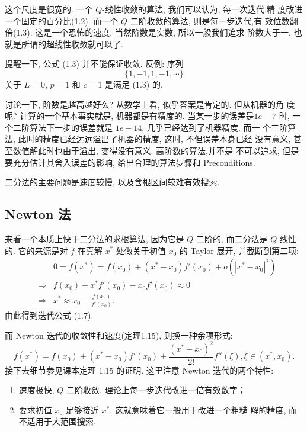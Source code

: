 \documentclass[a4paper]{ctexart}
\newcommand{\remark}[1]
{\noindent {\bf Remark {#1}}}
\begin{document}
这个尺度是很宽的. 一个 $Q$-线性收敛的算法, 我们可以认为, 每一次迭代,精
度改进一个固定的百分比(1.2). 而一个 $Q$-二阶收敛的算法, 则是每一步迭代,有
效位数翻倍(1.3). 这是一个恐怖的速度. 当然阶数是实数, 所以一般我们追求
阶数大于一, 也就是所谓的超线性收敛就可以了.

\remark{1.13} 提醒一下, 公式 (1.3) 并不能保证收敛. 反例: 序列
$$
\{1, -1, 1, -1, \cdots \}
$$
关于 $L = 0$, $p = 1$ 和 $c = 1$ 是满足 (1.3) 的.

讨论一下, 阶数是越高越好么? 从数学上看, 似乎答案是肯定的. 但从机器的角
度呢? 计算的一个基本事实就是, 机器都是有精度的. 当某一步的误差是$1e-7$
时, 一个二阶算法下一步的误差就是 $1e-14$, 几乎已经达到了机器精度. 而一
个三阶算法, 此时的精度已经远远溢出了机器的精度, 这时, 不但误差本身已经
没有意义, 甚至数值解此时也由于溢出, 变得没有意义. 高阶数的算法,并不是
不可以追求, 但是要充分估计其舍入误差的影响, 给出合理的算法步骤和
Preconditions.

\remark{1.15} 二分法的主要问题是速度较慢, 以及含根区间较难有效搜索. 


\subsection{Newton 法}

来看一个本质上快于二分法的求根算法, 因为它是 $Q$-二阶的, 而二分法是
$Q$-线性的. 它的来源是对 $f$ 在真解 $x^*$ 处做关于初值 $x_0$ 的 Taylor
展开, 并截断到第二项:
\begin{eqnarray*}
  &&0 = f(x^*)=f(x_0)+(x^* - x_0)f'(x_0) + o(|x^* - x_0|^2) \\
  &\Rightarrow&f(x_0) + x^*f'(x_0) - x_0f'(x_0) \approx 0 \\
  &\Rightarrow&x^* \approx x_0 - \frac{f(x_0)}{f'(x_0)}.
\end{eqnarray*}
由此得到迭代公式 (1.7).



而 Newton 迭代的收敛性和速度(定理1.15), 则换一种余项形式:
\[
  f(x^*) = f(x_0) + (x^* - x_0) f'(x_0) + \frac{(x^* -
    x_0)^2}{2!}f''(\xi), \xi \in (x^*, x_0).
\]
接下去细节参见课本定理 1.15 的证明. 这里注意 Newton 迭代的两个特性:
\begin{enumerate}
\item 速度极快, $Q$-二阶收敛. 理论上每一步迭代改进一倍有效数字；
\item 要求初值 $x_0$ 足够接近 $x^*$. 这就意味着它一般用于改进一个粗糙
  解的精度, 而不适用于大范围搜索.
\end{enumerate}
\end{document}
